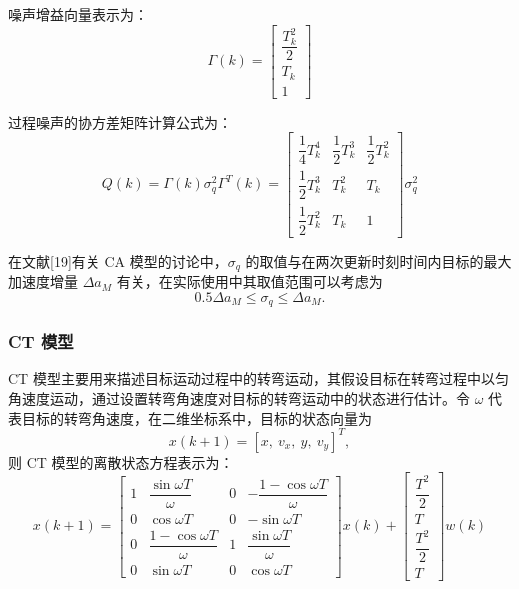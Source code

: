 \documentclass{xdupgthesis}
\begin{document}
噪声增益向量表示为：
\begin{equation}
	\Gamma(k)=
	\begin{bmatrix}
		\dfrac{T_k^2}{2}\\
		T_k\\
		1
	\end{bmatrix}
	\tag{2-19}
\end{equation}

过程噪声的协方差矩阵计算公式为：
\begin{equation}
	Q(k)=\Gamma(k)\sigma_q^2\Gamma^{T}(k)=
	\begin{bmatrix}
		\dfrac{1}{4}T_k^4 & \dfrac{1}{2}T_k^3 & \dfrac{1}{2}T_k^2\\[6pt]
		\dfrac{1}{2}T_k^3 & T_k^2 & T_k\\[6pt]
		\dfrac{1}{2}T_k^2 & T_k & 1
	\end{bmatrix}\sigma_q^2
	\tag{2-20}
\end{equation}

在文献[19]有关 CA 模型的讨论中，$\sigma_q$ 的取值与在两次更新时刻时间内目标的最大加速度增量 $\Delta a_M$ 有关，在实际使用中其取值范围可以考虑为
\[
0.5\Delta a_M \leq \sigma_q \leq \Delta a_M.
\]

\subsubsection{CT 模型}

CT 模型主要用来描述目标运动过程中的转弯运动，其假设目标在转弯过程中以匀角速度运动，通过设置转弯角速度对目标的转弯运动中的状态进行估计。令 $\omega$ 代表目标的转弯角速度，在二维坐标系中，目标的状态向量为
\[
x(k+1)=[x,\ v_x,\ y,\ v_y]^T,
\]
则 CT 模型的离散状态方程表示为：
\begin{equation}
	x(k+1)=
	\begin{bmatrix}
		1 & \dfrac{\sin \omega T}{\omega} & 0 & -\dfrac{1-\cos \omega T}{\omega}\\[8pt]
		0 & \cos \omega T & 0 & -\sin \omega T\\[6pt]
		0 & \dfrac{1-\cos \omega T}{\omega} & 1 & \dfrac{\sin \omega T}{\omega}\\[8pt]
		0 & \sin \omega T & 0 & \cos \omega T
	\end{bmatrix}
	x(k)
	+
	\begin{bmatrix}
		\dfrac{T^2}{2}\\
		T\\
		\dfrac{T^2}{2}\\
		T
	\end{bmatrix}
	w(k)
	\tag{2-21}
\end{equation}
\end{document}
